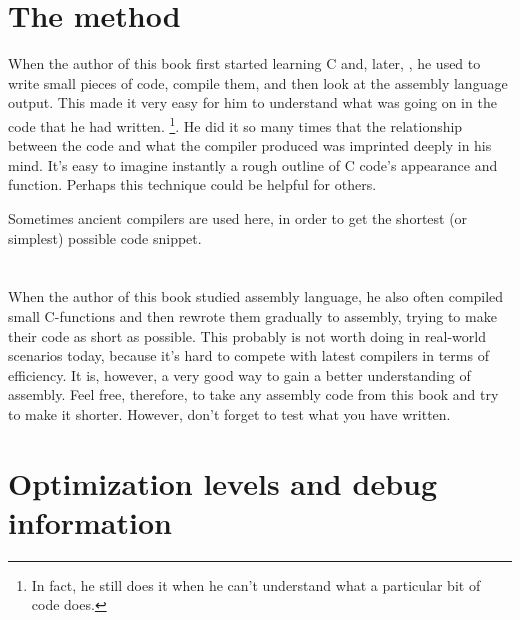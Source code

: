 \section{The method}

When the author of this book first started learning C and, later, \Cpp, he used to write small pieces of code, compile them, 
and then look at the assembly language output. This made it very easy for him to understand what was going on in the code that he had written.
\footnote{In fact, he still does it when he can't understand what a particular bit of code does.}. 
He did it so many times that the relationship between the \CCpp code and what the compiler produced was imprinted deeply in his mind. 
It's easy to imagine instantly a rough outline of C code's appearance and function. 
Perhaps this technique could be helpful for others.


Sometimes ancient compilers are used here, in order to get the shortest (or simplest) possible code snippet.

\section*{\Exercises}

When the author of this book studied assembly language, he also often compiled small C-functions and then rewrote
them gradually to assembly, trying to make their code as short as possible.
This probably is not worth doing in real-world scenarios today, 
because it's hard to compete with latest compilers in terms of efficiency. It is, however, a very good way to gain a better understanding of assembly.
Feel free, therefore, to take any assembly code from this book and try to make it shorter.
However, don't forget to test what you have written.

\section*{Optimization levels and debug information}


